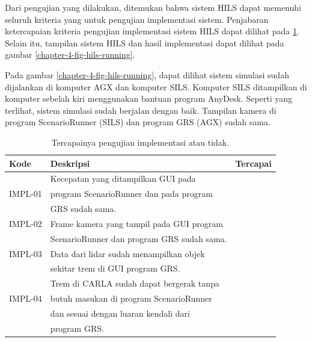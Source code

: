Dari pengujian yang dilakukan, ditemukan bahwa sistem HILS dapat memenuhi
seluruh kriteria yang untuk pengujian implementasi sistem. Penjabaran
ketercapaian kriteria pengujian implementasi sistem HILS dapat dilihat pada
\ref{chapter-4-tbl-impl-criteria-result}. Selain itu, tampilan sistem HILS dan
hasil implementasi dapat dilihat pada gambar \ref{chapter-4-fig-hils-running}.

Pada gambar \ref{chapter-4-fig-hils-running}, dapat dilihat sistem simulasi
sudah dijalankan di komputer AGX dan komputer SILS. Komputer SILS ditampilkan di
komputer sebelah kiri menggunakan bantuan program AnyDesk. Seperti yang
terlihat, sistem simulasi sudah berjalan dengan baik. Tampilan kamera di program
ScenarioRunner (SILS) dan program GRS (AGX) sudah sama.

\begin{table}[!htbp]
	\begin{center}
		\begin{tabular}{|l|l|l|}
			\hline
			\textbf{Kode} & \textbf{Deskripsi}                         & \textbf{Tercapai} \\
			\hline
			              & Kecepatan yang ditampilkan GUI pada        &                   \\
			IMPL-01       & program ScenarioRunner dan pada program    & \checkmark        \\
			              & GRS sudah sama.                            &                   \\
			\hline
			IMPL-02       & Frame kamera yang tampil pada GUI program  & \checkmark        \\
			              & ScenarioRunner dan program GRS sudah sama. &                   \\
			\hline
			IMPL-03       & Data dari lidar sudah menampilkan objek    & \checkmark        \\
			              & sekitar trem di GUI program GRS.           &                   \\
			\hline
			              & Trem di CARLA sudah dapat bergerak tanpa   &                   \\
			IMPL-04       & butuh masukan di program ScenarioRunner    & \checkmark        \\
			              & dan sesuai dengan luaran kendali dari      &                   \\
			              & program GRS.                               &                   \\
			\hline
		\end{tabular}
	\end{center}

	\caption{Tercapainya pengujian implementasi atau tidak.}
	\label{chapter-4-tbl-impl-criteria-result}
\end{table}

